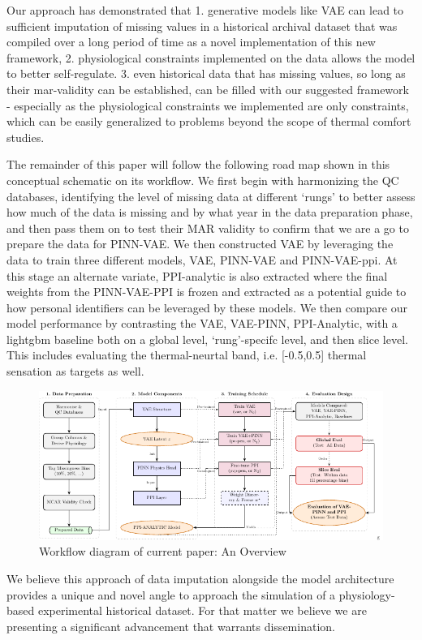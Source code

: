 Our approach has demonstrated that 1. generative models like VAE can lead to sufficient imputation of missing values in a historical archival dataset that was compiled over a long period of time as a novel implementation of this new framework, 2. physiological constraints implemented on the data allows the model to better self-regulate. %
3. even historical data that has missing values, so long as their \gls{mar}-validity can be established, can be filled with our suggested framework - especially as the physiological constraints we implemented are only constraints, which can be easily generalized to problems beyond the scope of thermal comfort studies. 

The remainder of this paper will follow the following road map shown in this conceptual schematic on its workflow. We first begin with harmonizing the QC databases, identifying the level of missing data at different `rungs' to better assess how much of the data is missing and by what year in the data preparation phase, and then pass them on to test their MAR validity to confirm that we are a go to prepare the data for PINN-VAE. We then constructed VAE by leveraging the data to train three different models, VAE, PINN-VAE and PINN-VAE-\gls{ppi}. At this stage an alternate variate, PPI-analytic is also extracted where the final weights from the PINN-VAE-PPI is frozen and extracted as a potential guide to how personal identifiers can be leveraged by these models. We then compare our model performance by contrasting the VAE, VAE-PINN, PPI-Analytic, with a \gls{lightgbm} baseline both on a global level, `rung'-specifc level, and then slice level. This includes evaluating the thermal-neurtal band, i.e. [-0.5,0.5] thermal sensation as targets as well.

\begin{figure}
    \centering
    \includegraphics[width=0.95\linewidth]{fig/PINN_VAE_Diagram.pdf}
    \caption{Workflow diagram of current paper: An Overview}
    \label{fig:workflow}
\end{figure}

We believe this approach of data imputation alongside the model architecture provides a unique and novel angle to approach the simulation of a physiology-based experimental historical dataset. For that matter we believe we are presenting a significant advancement that warrants dissemination.

